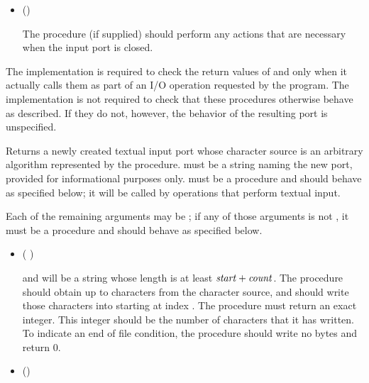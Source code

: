 \begin{entry}{%
}
\begin{itemize}
\item {\cf ()}
       
  The  procedure (if supplied) should perform any actions
  that are necessary when the input port is closed.
\end{itemize}

\implresp The implementation is required to check the return
values of  and  only when it actually calls
them as part of an I/O operation requested by the program.  The
implementation is not required to check that these procedures
otherwise behave as described.  If they do not, however, the behavior
of the resulting port is unspecified.
\end{entry}

\begin{entry}{%
}

Returns a newly created textual input port whose character source is
an arbitrary algorithm represented by the  procedure.
 must be a string naming the new port,
provided for informational purposes only.
 must be a procedure and should behave as specified
below; it will be called by operations that perform textual input.

Each of the remaining arguments may be \schfalse{}; if any of
those arguments is not \schfalse{}, it must be a procedure and
should behave as specified below.
   
\begin{itemize}
\item {\cf (   )}
       
  and  will be a string whose length is at least
  $\textnormal{\textit{start}} + \textnormal{\textit{count}}$.
  The  procedure should obtain up to  characters
  from the character source, and should write those characters
  into  starting at index .
  The  procedure must return an exact integer.  This
  integer should be the number of characters that it has written.
  To indicate an end of file condition, the 
  procedure should write no bytes and return 0.

\item {\cf ()}
       

\end{itemize}
\end{entry}
